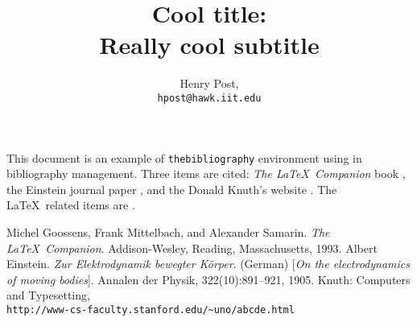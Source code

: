 \documentclass[a4paper,12pt]{article}
\title{Cool title: \\ Really cool subtitle}
\author{Henry Post, \\\texttt{hpost@hawk.iit.edu}}
\begin{document}
\maketitle

\newpage

This document is an example of \texttt{thebibliography} environment using in bibliography management. Three items are cited: \textit{The \LaTeX\ Companion} book \cite{latexcompanion}, the Einstein journal paper \cite{einstein}, and the Donald Knuth's website \cite{knuthwebsite}. The \LaTeX\ related items are \cite{latexcompanion,knuthwebsite}. 

\lipsum[2-4]


\medskip

\begin{thebibliography}{9}
 Michel Goossens, Frank Mittelbach, and Alexander Samarin. \textit{The \LaTeX\ Companion}. Addison-Wesley, Reading, Massachusetts, 1993.
 Albert Einstein. \textit{Zur Elektrodynamik bewegter K{\"o}rper}. (German) [\textit{On the electrodynamics of moving bodies}]. Annalen der Physik, 322(10):891–921, 1905.
 Knuth: Computers and Typesetting,\\\texttt{http://www-cs-faculty.stanford.edu/\~{}uno/abcde.html}
\end{thebibliography}
\end{document}
